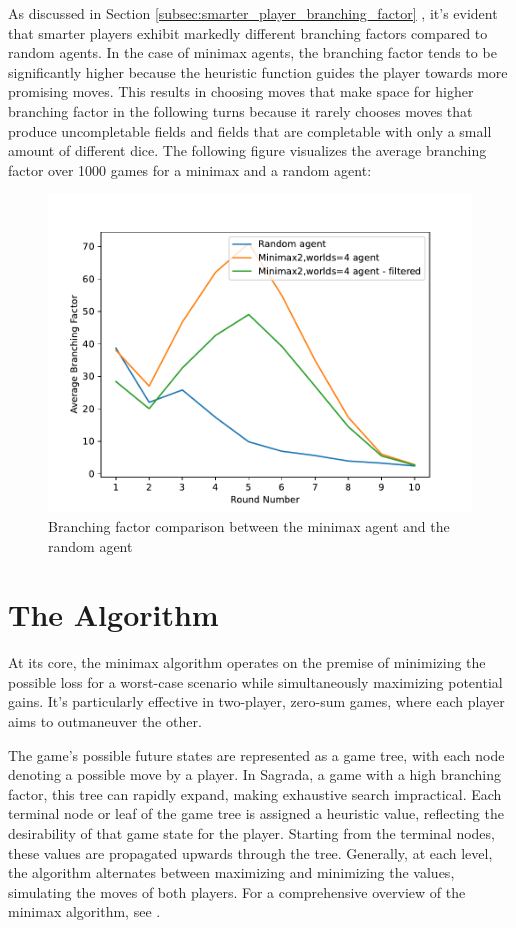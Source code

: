 As discussed in Section \ref{subsec:smarter_player_branching_factor} , it's evident that smarter players exhibit markedly different branching factors compared to random agents.
In the case of minimax agents, the branching factor tends to be significantly higher because the heuristic function guides the player towards more promising moves. This results
in choosing moves that make space for higher branching factor in the following turns because it rarely chooses moves that produce uncompletable fields and fields that 
are completable with only a small amount of different dice. The following figure visualizes the average branching factor over 1000 games for a minimax and a random agent:

\begin{figure}[H]
    \caption{ Branching factor comparison between the minimax agent and the random agent}
    \centerline{\mbox{\includegraphics[width=180mm]{img/minimax_agent_branching_factor.pdf}}}
    \label{fig:example}
\end{figure}


\section{The Algorithm}

At its core, the minimax algorithm operates on the premise of minimizing the possible loss for a worst-case scenario while simultaneously maximizing potential gains. 
It's particularly effective in two-player, zero-sum games, where each player aims to outmaneuver the other. 

The game's possible future states are represented as a game tree, with each node denoting a possible move by a player. In Sagrada, a game with a high branching factor, 
this tree can rapidly expand, making exhaustive search impractical.  Each terminal node or leaf of the game tree is assigned a heuristic value, 
reflecting the desirability of that game state for the player. Starting from the terminal nodes, these values are propagated upwards through the tree. 
Generally, at each level, the algorithm alternates between maximizing and minimizing the values, simulating the moves of both players. 
For a comprehensive overview of the minimax algorithm, see \cite{enwiki:1217764079}.


